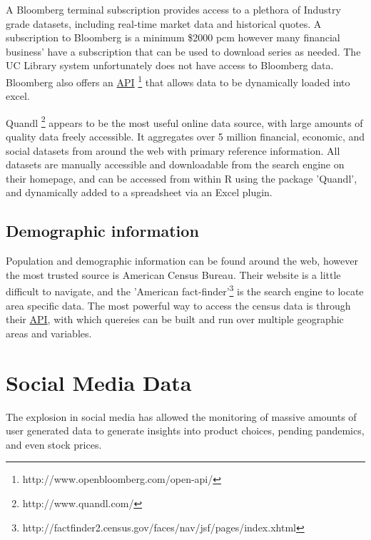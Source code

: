 \documentclass[11pt]{article}
\begin{document}
	A Bloomberg terminal subscription provides access to a plethora of Industry grade datasets, including real-time market data and historical quotes.
	A subscription to Bloomberg is a minimum \$2000 pcm however many financial business' have a subscription that can be used to download series as needed.
	The UC Library system unfortunately does not have access to Bloomberg data.
	Bloomberg also offers an \hyperref[api]{API} \footnote{http://www.openbloomberg.com/open-api/} that allows data to be dynamically loaded into excel.

	Quandl \footnote{http://www.quandl.com/} appears to be the most useful online data source, with large amounts of quality data freely accessible.
	It aggregates over 5 million financial, economic, and social datasets from around the web with primary reference information.
	All datasets are manually accessible and downloadable from the search engine on their homepage, and can be accessed from within R using the package 'Quandl', and dynamically added to a spreadsheet via an Excel plugin. 

	
	\subsection{Demographic information}

	Population and demographic information can be found around the web, however the most trusted source is American Census Bureau. 
	Their website is a little difficult to navigate, and the 'American fact-finder'\footnote{http://factfinder2.census.gov/faces/nav/jsf/pages/index.xhtml} is the search engine to locate area specific data.
	The most powerful way to access the census data is through their \hyperref[api]{API}, with which quereies can be built and run over multiple geographic areas and variables.


	\section{Social Media Data}
	The explosion in social media has allowed the monitoring of massive amounts of user generated data to generate insights into product choices, pending pandemics, and even stock prices.
\end{document}
